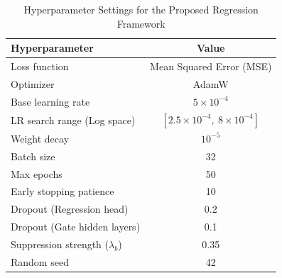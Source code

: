 \documentclass{article}
\begin{document}
\begin{table}[htbp]
\centering
\caption{Hyperparameter Settings for the Proposed Regression Framework}
\begin{tabular}{lc}
\toprule
\textbf{Hyperparameter} & \textbf{Value} \\
\midrule
Loss function & Mean Squared Error (MSE) \\
Optimizer & AdamW \\
Base learning rate & $5 \times 10^{-4}$ \\
LR search range (Log space) & $[2.5 \times 10^{-4},\ 8 \times 10^{-4}]$ \\
Weight decay & $10^{-5}$ \\
Batch size & 32 \\
Max epochs & 50 \\
Early stopping patience & 10 \\
Dropout (Regression head) & 0.2 \\
Dropout (Gate hidden layers) & 0.1 \\
Suppression strength ($\lambda_b$) & 0.35 \\
Random seed & 42 \\
\bottomrule
\end{tabular}
\end{table}
\end{document}
